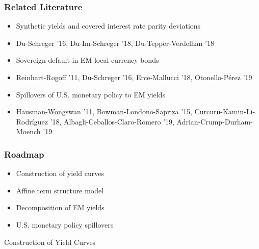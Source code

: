 \documentclass[12pt, aspectratio=169, xcolor=dvipsnames]{beamer}  %
\begin{document}
\begin{frame}[label=LitReview]
	\frametitle{Related Literature}
	\begin{itemize}
		\item Synthetic yields and covered interest rate parity deviations
		\vspace{-3mm}
		\item[] {\footnotesize Du-Schreger '16, Du-Im-Schreger '18, Du-Tepper-Verdelhan '18}
		\item Sovereign default in EM local currency bonds
		\vspace{-3mm}
		\item[] {\footnotesize Reinhart-Rogoff '11, Du-Schreger '16, Erce-Mallucci '18, Otonello-Pérez '19}
		\item Spillovers of U.S. monetary policy to EM yields
		\vspace{-3mm}
		\item[] {\footnotesize Hausman-Wongswan '11, Bowman-Londono-Sapriza '15, Curcuru-Kamin-Li-Rodríguez '18, Albagli-Ceballos-Claro-Romero '19, Adrian-Crump-Durham-Moench '19}
	\end{itemize}
\end{frame}

\begin{frame}
	\frametitle{Roadmap}
	\begin{itemize}
		\item Construction of yield curves
		\item Affine term structure model
		\item Decomposition of EM yields
		\item U.S. monetary policy spillovers
	\end{itemize}
\end{frame}



\begin{frame}
\begin{center}
	\huge \textcolor{yaleblue}{Construction of Yield Curves}
\end{center}
\end{frame}
\end{document}
